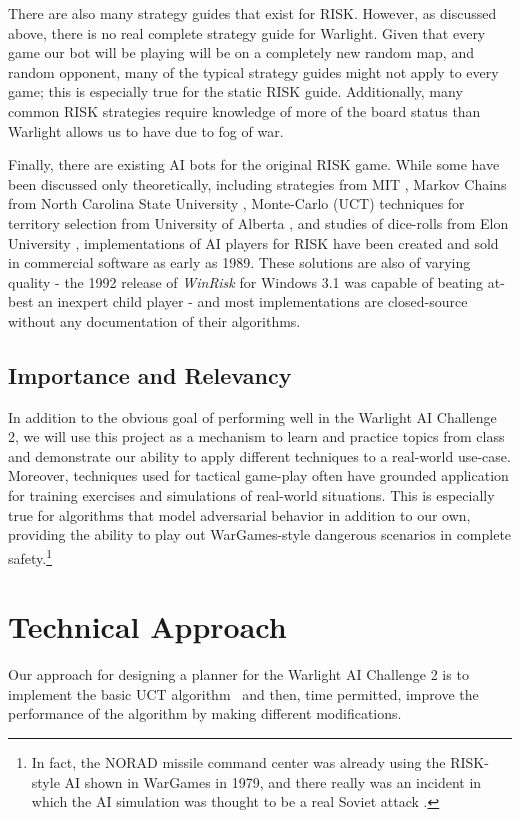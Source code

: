 \documentclass[a4paper,11pt]{article}
\begin{document}
There are also many strategy guides that exist for RISK.  However, as discussed 
above, there is no real complete strategy guide for Warlight.  Given that every 
game our bot will be playing will be on a completely new random map, and random opponent, 
many of the typical strategy guides might not apply to every game; this is especially 
true for the static RISK guide.  Additionally, many common RISK strategies require knowledge 
of more of the board status than Warlight allows us to have due to fog of war.

Finally, there are existing AI bots for the original RISK game.  While some have been 
discussed only theoretically, including strategies from MIT \cite{riskmit}, Markov 
Chains from North Carolina State University \cite{riskncs}, Monte-Carlo (UCT) 
techniques for territory selection from University of Alberta \cite{riskalb}, and 
studies of dice-rolls from Elon University \cite{riskelon}, implementations of AI 
players for RISK have been created and sold in commercial software as early as 1989. 
These solutions are also of varying quality - the 1992 release of \textit{WinRisk} for 
Windows 3.1 was capable of beating at-best an inexpert child player - and most 
implementations are closed-source without any documentation of their algorithms.

\subsection{Importance and Relevancy}\label{sec:importance}
In addition to the obvious goal of performing well in the Warlight AI Challenge 2, 
we will use this project as a mechanism to learn and practice topics from class and 
demonstrate our ability to apply different techniques to a real-world use-case.
Moreover, techniques used for tactical game-play often have grounded 
application for training exercises and simulations of real-world situations.  This is 
especially true for algorithms that model adversarial behavior in addition to our 
own, providing the ability to play out WarGames-style dangerous scenarios in 
complete safety.\footnote{In fact, the NORAD missile command center was already 
using the RISK-style AI shown in WarGames in 1979, and there really was an incident
in which the AI simulation was thought to be a real Soviet attack
\cite{wargamesreal}.}

%
\section{Technical Approach}\label{sec:approach}
Our approach for designing a planner for the Warlight AI Challenge 2 is to implement the basic UCT algorithm~\cite{uct} and then, time permitted, improve the performance of the algorithm by making different modifications.
\end{document}
